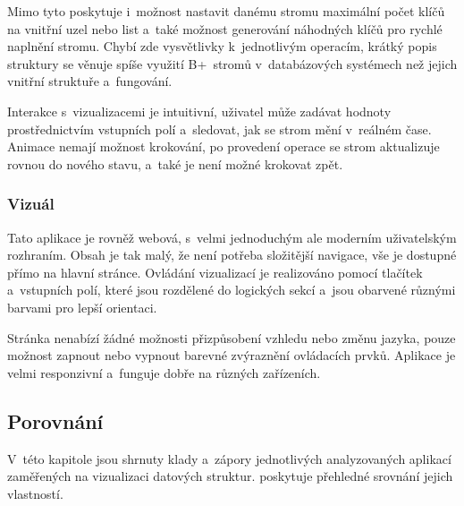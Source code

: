 Mimo tyto poskytuje i~možnost nastavit danému stromu maximální počet klíčů na vnitřní uzel nebo list a~také možnost generování náhodných klíčů pro rychlé naplnění stromu.
Chybí zde vysvětlivky k~jednotlivým operacím, krátký popis struktury se věnuje spíše využití B+~stromů v~databázových systémech než jejich vnitřní struktuře a~fungování.

Interakce s~vizualizacemi je intuitivní, uživatel může zadávat hodnoty prostřednictvím vstupních polí a~sledovat, jak se strom mění v~reálném čase.
Animace nemají možnost krokování, po provedení operace se strom aktualizuje rovnou do nového stavu, a~také je není možné krokovat zpět.

\subsubsection*{Vizuál}

Tato aplikace je rovněž webová, s~velmi jednoduchým ale moderním uživatelským rozhraním.
Obsah je tak malý, že není potřeba složitější navigace, vše je dostupné přímo na hlavní stránce.
Ovládání vizualizací je realizováno pomocí tlačítek a~vstupních polí, které jsou rozdělené do logických sekcí a~jsou obarvené různými barvami pro lepší orientaci.

Stránka nenabízí žádné možnosti přizpůsobení vzhledu nebo změnu jazyka, pouze možnost zapnout nebo vypnout barevné zvýraznění ovládacích prvků.
Aplikace je velmi responzivní a~funguje dobře na různých zařízeních.

\pagebreak
\subsection{Porovnání}
\label{subsec:other_apps_ds_comparison}

V~této kapitole jsou shrnuty klady a~zápory jednotlivých analyzovaných aplikací zaměřených na vizualizaci datových struktur.
 poskytuje přehledné srovnání jejich vlastností.

